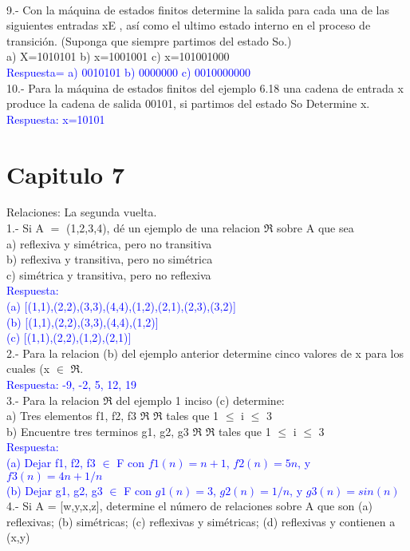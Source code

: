\documentclass{article}
\begin{document}
\\
9.- Con la máquina de estados finitos determine la salida para cada una de las siguientes entradas xE , así como el ultimo estado interno en el proceso de transición. (Suponga que siempre partimos del estado So.)\\
a) X=1010101		b) x=1001001		c) x=101001000\\
\textcolor{blue}{Respuesta=	 a) 0010101		b) 0000000		c) 0010000000}
\\
10.- Para la máquina de estados finitos del ejemplo 6.18 una cadena de entrada x produce la cadena de salida 00101, si partimos del estado So Determine x.\\ 
\textcolor{blue}{Respuesta: x=10101}
\section{Capitulo 7}Relaciones: La segunda vuelta.\\
1.- Si A $=$ (1,2,3,4), dé un ejemplo de una relacion $\Re $ sobre A que sea\\
a) reflexiva y simétrica, pero no transitiva\\
b) reflexiva y transitiva, pero no simétrica \\
c) simétrica y transitiva, pero no reflexiva\\
\textcolor{blue}{Respuesta: \\
(a) [(1,1),(2,2),(3,3),(4,4),(1,2),(2,1),(2,3),(3,2)]\\ 
(b) [(1,1),(2,2),(3,3),(4,4),(1,2)]\\
(c) [(1,1),(2,2),(1,2),(2,1)]}\\
2.- Para la relacion (b) del ejemplo anterior determine cinco valores de x para los cuales (x $\in$ $\Re $.\\
\textcolor{blue}{Respuesta: -9, -2, 5, 12, 19 \\
}
3.- Para la relacion $\Re$ del ejemplo 1 inciso (c) determine:\\
a) Tres elementos f1, f2, f3 $\Re$ $\Re$ tales que 1 $\leq$ i $\leq$ 3\\
b) Encuentre tres terminos g1, g2, g3 $\Re$ $\Re$ tales que 1 $\leq$ i $\leq$ 3\\
\textcolor{blue}{ Respuesta: \\
(a) Dejar f1, f2, f3 $\in$ F con $f1(n) = n+1$, $f2(n) = 5n$, y $f3(n) = 4n +1/n$ \\
(b) Dejar g1, g2, g3 $\in$ F con $g1(n) = 3$, $g2(n) = 1/n$, y $g3(n) = sin(n)$
}
\\
4.- Si A = [w,y,x,z], determine el número de relaciones sobre A que son (a) reflexivas; (b) simétricas; (c) reflexivas y simétricas; (d) reflexivas y contienen a (x,y) \\
\end{document}
